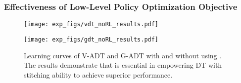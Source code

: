 




\subsubsection{Effectiveness of Low-Level Policy Optimization Objective}

\begin{figure}[!htbp]
\centering

\begin{minipage}[t]{1\textwidth}
\centering
\texttt{[image: exp\_figs/vdt\_noRL\_results.pdf]}
\end{minipage}
\begin{minipage}[t]{1\textwidth}
\centering
\texttt{[image: exp\_figs/gdt\_noRL\_results.pdf]}
\end{minipage}


\caption{Learning curves of V-ADT and G-ADT with and without using .  The results demonstrate that  is essential in empowering DT with stitching ability to achieve superior performance.}
\label{fig:rl_loss_ablation}
\end{figure}

